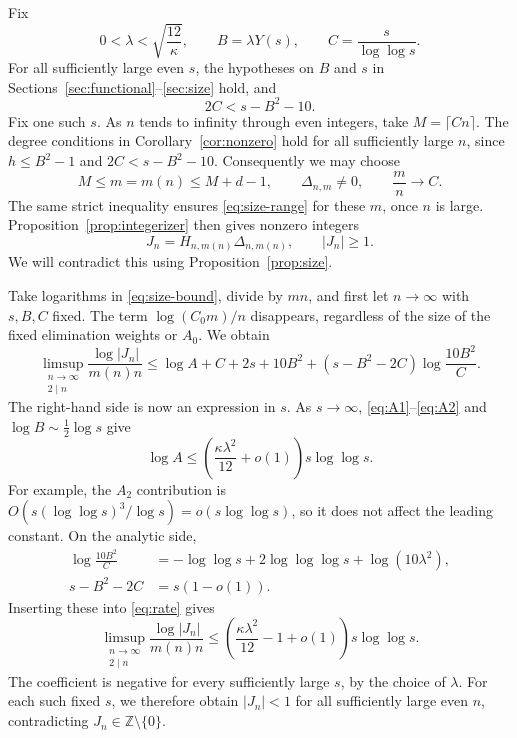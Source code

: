 \documentclass[11pt]{article}
\theoremstyle{remark}
\newcommand{\Z}{\mathbb Z}
\numberwithin{equation}{section}
\begin{document}
Fix
\[
 0<\lambda<\sqrt{\frac{12}{\kappa}},\qquad
 B=\lambda Y(s),\qquad C=\frac{s}{\log\log s}.
\]
For all sufficiently large even $s$, the hypotheses on $B$ and $s$ in
Sections~\ref{sec:functional}--\ref{sec:size} hold, and
\[
 2C<s-B^2-10.
\]
Fix one such $s$. As $n$ tends to infinity through even integers, take
$M=\lceil Cn\rceil$. The degree conditions in Corollary~\ref{cor:nonzero}
hold for all sufficiently large $n$, since $h\leq B^2-1$ and
$2C<s-B^2-10$. Consequently we may choose
\[
 M\leq m=m(n)\leq M+d-1,
 \qquad\Delta_{n,m}\ne0,
 \qquad\frac{m}{n}\longrightarrow C.
\]
The same strict inequality ensures \eqref{eq:size-range} for these $m$,
once $n$ is large. Proposition~\ref{prop:integerizer} then gives nonzero
integers
\[
 J_n=H_{n,m(n)}\Delta_{n,m(n)},\qquad |J_n|\geq1.
\]
We will contradict this using Proposition~\ref{prop:size}.

Take logarithms in \eqref{eq:size-bound}, divide by $mn$, and first let
$n\to\infty$ with $s,B,C$ fixed. The term $\log(C_0m)/n$ disappears,
regardless of the size of the fixed elimination weights or $A_0$. We obtain
\begin{equation}\label{eq:rate}
 \limsup_{\substack{n\to\infty\\2\mid n}}
 \frac{\log|J_n|}{m(n)n}
 \leq \log A+C+2s+10B^2
        +(s-B^2-2C)\log\frac{10B^2}{C}.
\end{equation}
The right-hand side is now an expression in $s$. As $s\to\infty$,
\eqref{eq:A1}--\eqref{eq:A2} and $\log B\sim\frac12\log s$ give
\begin{equation}\label{eq:arithmetic-rate}
 \log A\leq
 \left(\frac{\kappa\lambda^2}{12}+o(1)\right)s\log\log s.
\end{equation}
For example, the $A_2$ contribution is
$O(s(\log\log s)^3/\log s)=o(s\log\log s)$, so it does not affect
the leading constant. On the analytic side,
\begin{align*}
 \log\frac{10B^2}{C}
 &=-\log\log s+2\log\log\log s+\log(10\lambda^2),\\
 s-B^2-2C&=s(1-o(1)).
\end{align*}
Inserting these into \eqref{eq:rate} gives
\[
 \limsup_{\substack{n\to\infty\\2\mid n}}
 \frac{\log|J_n|}{m(n)n}
 \leq\left(\frac{\kappa\lambda^2}{12}-1+o(1)\right)s\log\log s.
\]
The coefficient is negative for every sufficiently large $s$, by the
choice of $\lambda$. For each such fixed $s$, we therefore obtain
$|J_n|<1$ for all sufficiently large even $n$, contradicting
$J_n\in\Z\setminus\{0\}$.
\end{document}
